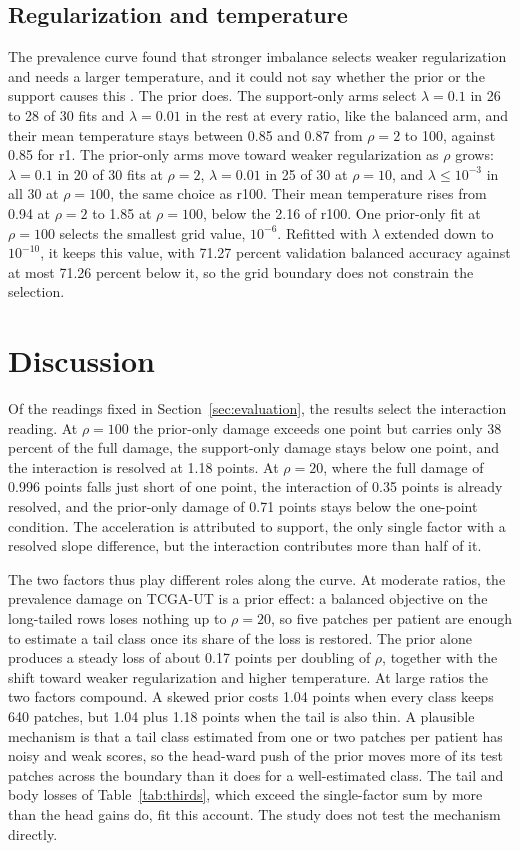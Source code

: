 \subsection{Regularization and temperature}
\label{sec:selection-results}
The prevalence curve found that stronger imbalance selects weaker regularization and needs a larger temperature, and it could not say whether the prior or the support causes this \citep{queisler2026prevalenceTcga}. The prior does. The support-only arms select $\lambda=0.1$ in 26 to 28 of 30 fits and $\lambda=0.01$ in the rest at every ratio, like the balanced arm, and their mean temperature stays between 0.85 and 0.87 from $\rho=2$ to 100, against 0.85 for r1. The prior-only arms move toward weaker regularization as $\rho$ grows: $\lambda=0.1$ in 20 of 30 fits at $\rho=2$, $\lambda=0.01$ in 25 of 30 at $\rho=10$, and $\lambda\leq10^{-3}$ in all 30 at $\rho=100$, the same choice as r100. Their mean temperature rises from 0.94 at $\rho=2$ to 1.85 at $\rho=100$, below the 2.16 of r100. One prior-only fit at $\rho=100$ selects the smallest grid value, $10^{-6}$. Refitted with $\lambda$ extended down to $10^{-10}$, it keeps this value, with 71.27 percent validation balanced accuracy against at most 71.26 percent below it, so the grid boundary does not constrain the selection.

\section{Discussion}
\label{sec:discussion}
Of the readings fixed in Section~\ref{sec:evaluation}, the results select the interaction reading. At $\rho=100$ the prior-only damage exceeds one point but carries only 38 percent of the full damage, the support-only damage stays below one point, and the interaction is resolved at 1.18 points. At $\rho=20$, where the full damage of 0.996 points falls just short of one point, the interaction of 0.35 points is already resolved, and the prior-only damage of 0.71 points stays below the one-point condition. The acceleration is attributed to support, the only single factor with a resolved slope difference, but the interaction contributes more than half of it.

The two factors thus play different roles along the curve. At moderate ratios, the prevalence damage on TCGA-UT is a prior effect: a balanced objective on the long-tailed rows loses nothing up to $\rho=20$, so five patches per patient are enough to estimate a tail class once its share of the loss is restored. The prior alone produces a steady loss of about 0.17 points per doubling of $\rho$, together with the shift toward weaker regularization and higher temperature. At large ratios the two factors compound. A skewed prior costs 1.04 points when every class keeps 640 patches, but 1.04 plus 1.18 points when the tail is also thin. A plausible mechanism is that a tail class estimated from one or two patches per patient has noisy and weak scores, so the head-ward push of the prior moves more of its test patches across the boundary than it does for a well-estimated class. The tail and body losses of Table~\ref{tab:thirds}, which exceed the single-factor sum by more than the head gains do, fit this account. The study does not test the mechanism directly.

